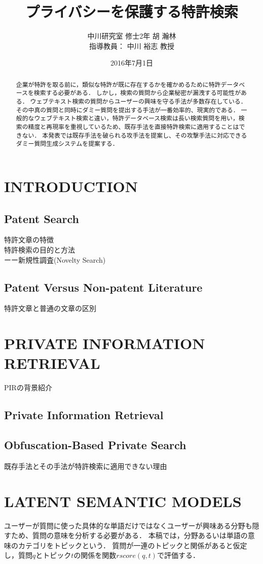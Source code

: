 \documentclass{jsarticle}
\title{プライバシーを保護する特許検索}
\author{中川研究室 修士2年 胡 瀚林\\指導教員： 中川 裕志 教授}
\date{2016年7月1日}
\theoremstyle{definition}
\begin{document}
\maketitle
\begin{abstract}
企業が特許を取る前に，類似な特許が既に存在するかを確かめるために特許データベースを検索する必要がある．
しかし，検索の質問から企業秘密が漏洩する可能性がある．
ウェブテキスト検索の質問からユーザーの興味を守る手法が多数存在している．
その中真の質問と同時にダミー質問を提出する手法が一番効率的、現実的である．
一般的なウェブテキスト検索と違い，特許データベース検索は長い検索質問を用い，検索の精度と再現率を重視しているため、既存手法を直接特許検索に適用することはできない．
本発表では既存手法を破られる攻手法を提案し、その攻撃手法に対応できるダミー質問生成システムを提案する．
\end{abstract}


\section{INTRODUCTION}


\subsection{Patent Search}
特許文章の特徴\\
特許検索の目的と方法\\
ーー新規性調査(Novelty Search)
\subsection{Patent Versus Non-patent Literature}
特許文章と普通の文章の区別
\section{PRIVATE INFORMATION RETRIEVAL}
PIRの背景紹介
\subsection{Private Information Retrieval}
\subsection{Obfuscation-Based Private Search}
既存手法とその手法が特許検索に適用できない理由

\section{LATENT SEMANTIC MODELS}
ユーザーが質問に使った具体的な単語だけではなくユーザーが興味ある分野も隠すため、質問の意味を分析する必要がある．
本稿では，分野あるいは単語の意味のカテゴリをトピックという．
質問が一連のトピックと関係があると仮定し，質問$q$とトピック$t$の関係を関数$rscore(q,t)$で評価する．
\end{document}
